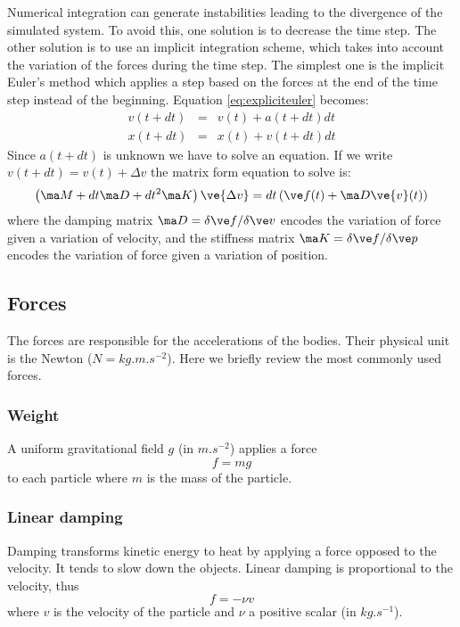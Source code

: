 Numerical integration can generate instabilities leading to the divergence of the simulated system. To avoid this, one solution is to decrease the time step. The other solution is to use an implicit integration scheme, which takes into account the variation of the forces during the time step. The simplest one is the implicit Euler's method which applies a step based on the forces at the end of the time step instead of the beginning. Equation \ref{eq:expliciteuler} becomes:
\begin{eqnarray}
v(t+dt) &=& v(t)+a(t+dt)dt \nonumber\\
x(t+dt) &=& x(t)+v(t+dt)dt \label{eq:impliciteuler}
\end{eqnarray}
Since $a(t+dt)$ is unknown we have to solve an equation.
If we write $v(t+dt) = v(t)+\Delta v$ the matrix form equation to solve is:
\begin{equation}
\label{eq:matimplicit}
\left( \ma M + dt \ma D + dt^2 \ma K \right) \ve{\Delta v} = dt \left( \ve f(t) + \ma D \ve{v}(t) \right) 
\end{equation}
where the damping matrix $\ma D = \delta \ve f/\delta \ve v$ encodes the variation of force given a variation of velocity, and the stiffness matrix $\ma K = \delta \ve f/\delta \ve p$ encodes the variation of force given a variation of position.

\subsection{Forces}
The forces are responsible for the accelerations of the bodies. Their physical unit is the Newton ($N=kg.m.s^{-2}$).
Here we briefly review the most commonly used forces.

\subsubsection{Weight}
A uniform gravitational field $g$ (in $m.s^{-2}$) applies a force 
\begin{equation} \label{eq:gravity}
f = mg
\end{equation} 
to each particle where $m$ is the mass of the particle.

\subsubsection{Linear damping}
Damping transforms kinetic energy to heat by applying a force opposed to the velocity. It tends to slow down the objects. Linear damping is proportional to the velocity, thus 
\begin{equation}\label{eq:lineardamping}
f=-\nu v
\end{equation}
where $v$ is the velocity of the particle and $\nu$ a positive scalar (in $kg.s^{-1}$).

